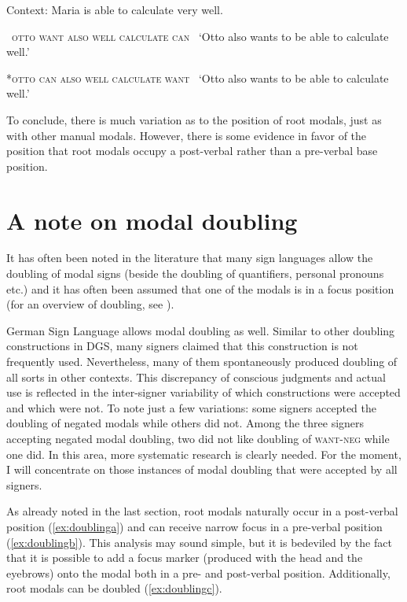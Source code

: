\begin{exe}
\ex Context: Maria is able to calculate very well.\label{calculation}\begin{xlist}
\ex\label{bsp:calculatea}
{\textcolor{white}{*}\textsc{otto want also well calculate can}}    
\glt \textcolor{white}{*}`Otto also wants to be able to calculate well.' 

\ex\label{bsp:calculateb}
{*\textsc{otto can also well calculate want}}    
\glt \textcolor{white}{*}`Otto also wants to be able to calculate well.' 

\end{xlist}
\end{exe}

\noindent To conclude, there is much variation as to the position of root modals, just as with other manual modals. However, there is some evidence in favor of the position that root modals occupy a post-verbal rather than a pre-verbal base position. 


\section{A note on modal doubling}\label{modaldoubling}
It has often been noted in the literature that many sign languages allow the doubling of modal signs (beside the doubling of quantifiers, personal pronouns etc.) and it has often been assumed that one of the modals is in a focus position (for an overview of doubling, see \citealt{petronio1993clause,nunesquadros2008phonetically}).

German Sign Language allows modal doubling as well. Similar to other doubling constructions in DGS, many signers claimed that this construction is not frequently used. Nevertheless, many of them spontaneously produced doubling of all sorts in other contexts. This discrepancy of conscious judgments and actual use is reflected in the inter-signer variability of which constructions were accepted and which were not. To note just a few variations: some signers accepted the doubling of negated modals while others did not. Among the three signers accepting negated modal doubling, two did not like doubling of \textsc{want-neg} while one did. In this area, more systematic research is clearly needed. For the moment, I will concentrate on those instances of modal doubling that were accepted by all signers.

As already noted in the last section, root modals naturally occur in a post-verbal position (\ref{ex:doublinga}) and can receive narrow focus in a pre-verbal position (\ref{ex:doublingb}). This analysis may sound simple, but it is bedeviled by the fact that it is possible to add a focus marker (produced with the head and the eyebrows) onto the modal both in a pre- and post-verbal position. Additionally, root modals can be doubled (\ref{ex:doublingc}). 

